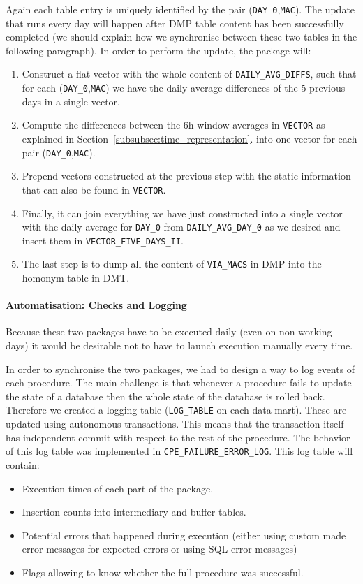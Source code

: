 Again each table entry is uniquely identified by the pair (\texttt{DAY\_0},\texttt{MAC}). The update that runs every day will happen after DMP table content has been successfully completed (we should explain how we synchronise between these two tables in the following paragraph). In order to perform the update, the package will:
\begin{enumerate}
	\item Construct a flat vector with the whole content of \texttt{DAILY\_AVG\_DIFFS}, such that for each (\texttt{DAY\_0},\texttt{MAC}) we have the daily average differences of the 5 previous days in a single vector.
	\item Compute the differences between the 6h window averages in \texttt{VECTOR} as explained in Section~\ref{subsubsec:time_representation}. into one vector for each pair (\texttt{DAY\_0},\texttt{MAC}).
	\item Prepend vectors constructed at the previous step with the static information that can also be found in \texttt{VECTOR}.
	\item Finally, it can join everything we have just constructed into a single vector with the daily average for \texttt{DAY\_0} from \texttt{DAILY\_AVG\_DAY\_0} as we desired and insert them in \texttt{VECTOR\_FIVE\_DAYS\_II}.
	\item The last step is to dump all the content of \texttt{VIA\_MACS} in DMP into the homonym table in DMT.
\end{enumerate}

\paragraph{Automatisation: Checks and Logging}
Because these two packages have to be executed daily (even on non-working days) it would be desirable not to have to launch execution manually every time. 

In order to synchronise the two packages, we had to design a way to log events of each procedure. The main challenge is that whenever a procedure fails to update the state of a database then the whole state of the database is rolled back. Therefore we created a logging table (\texttt{LOG\_TABLE} on each data mart). These are updated using autonomous transactions. This means that the transaction itself has independent commit with respect to the rest of the procedure. The behavior of this log table was implemented in \texttt{CPE\_FAILURE\_ERROR\_LOG}. This log table will contain:
\begin{itemize}[noitemsep]
	\item Execution times of each part of the package.
	\item Insertion counts into intermediary and buffer tables.
	\item Potential errors that happened during execution (either using custom made error messages for expected errors or using SQL error messages)
	\item Flags allowing to know whether the full procedure was successful. 
\end{itemize}		

